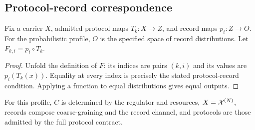 \subsection{Protocol-record correspondence}\label{ss:profile-correspondence}

Fix a carrier $X$, admitted protocol maps $T_k:X\to Z$, and
record maps $p_i:Z\to O$. For the probabilistic profile, $O$ is
the specified space of record distributions. Let
$F_{k,i}=p_i\circ T_k$.

\begin{proof}
Unfold the definition of $F$: its indices are pairs $(k,i)$ and its
values are $p_i(T_k(x))$. Equality at every index is precisely the
stated protocol-record condition. Applying a function to equal
distributions gives equal outputs.
\end{proof}

For this profile, $C$ is determined by the regulator and resources,
$X=\mathcal{X}^{(N)}$, records compose coarse-graining and the record
channel, and protocols are those admitted by the full protocol contract.
